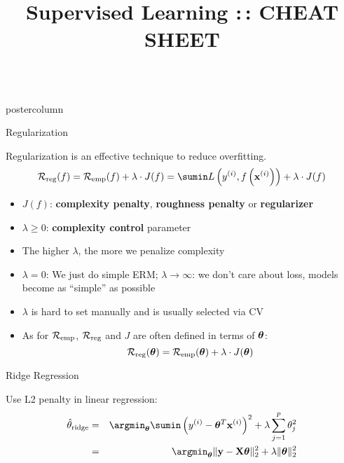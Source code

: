 \documentclass{beamer}
\title{Supervised Learning :\,: CHEAT SHEET} %
\newlength{\columnheight} %
\begin{document}
\begin{frame}[fragile]{}
\begin{columns}
	\begin{column}{.31\textwidth}
		\begin{beamercolorbox}[center]{postercolumn}
			\begin{minipage}{.98\textwidth}
				\parbox[t][\columnheight]{\textwidth}{

					\begin{myblock}{Regularization}

            Regularization is an effective technique to reduce overfitting.
  $$
  \riskrf = \riskef + \lambda \cdot J(f) = \sumin \Lxyi + \lambda \cdot J(f)
  $$
\begin{itemize}[$\bullet$]
  \setlength{\itemindent}{+.3in}
  \item $J(f)$: \textbf{complexity penalty}, \textbf{roughness penalty} or \textbf{regularizer}
  \item $\lambda \geq 0$: \textbf{complexity control} parameter
  \item The higher $\lambda$, the more we penalize complexity

  \item $\lambda = 0$: We just do simple ERM; $\lambda \to \infty$: we don't care about loss, models become as \enquote{simple} as possible

\item $\lambda$ is hard to set manually and is usually selected via CV

  \item As for $\mathcal{R}_{\text{emp}}$, $\mathcal{R}_{\text{reg}}$ and $J$ are often defined in terms of $\bm{\theta}$: \\
  
  $$\mathcal{R}_{\text{reg}}(\bm{\theta}) = \mathcal{R}_{\text{emp}}(\bm{\theta}) + \lambda \cdot J(\bm{\theta})$$

\end{itemize}

\end{myblock}

\begin{myblock}{Ridge Regression}

Use L2 penalty in linear regression:
\begin{eqnarray*}  
\thetah_{\text{ridge}} &=& \argmin_{\thetav} \sumin \left(\yi - \thetav^T \xi \right)^2 + \lambda \sum_{j=1}^{p} \theta_j^2 \\
&=& \argmin_{\thetav} \| \yv - \Xmat \thetav \|_2^2  + \lambda \|\thetav\|_2^2
\end{eqnarray*}


\end{myblock}}
\end{minipage}
\end{beamercolorbox}
\end{column}
\end{columns}
\end{frame}
\end{document}
